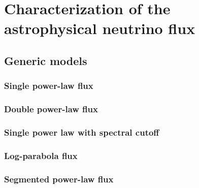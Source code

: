 \section{Characterization of the astrophysical neutrino flux\label{sec:diffuse}}
\begingroup
\graphicspath{{results/HESE_Final_Paper/}}

\endgroup

\subsection{Generic models\label{sec:generic_models}}
\begingroup
\graphicspath{{results/HESE_Final_Paper/}}

\endgroup

\subsubsection{Single power-law flux\label{sec:spl}}
\begingroup
\graphicspath{{results/HESE_Final_Paper/}}

\endgroup

\subsubsection{Double power-law flux\label{sec:dpl}}
\begingroup
\graphicspath{{results/HESE_Final_Paper/}}

\endgroup

\subsubsection{Single power law with spectral cutoff\label{sec:cutoff}}
\begingroup
\graphicspath{{results/HESE_Final_Paper/}}

\endgroup

\subsubsection{Log-parabola flux\label{sec:log_parabola}}
\begingroup
\graphicspath{{results/HESE_Final_Paper/}}

\endgroup

\subsubsection{Segmented power-law flux\label{sec:unfolding}}
\begingroup
\graphicspath{{results/HESE_Final_Paper/}}

\endgroup

